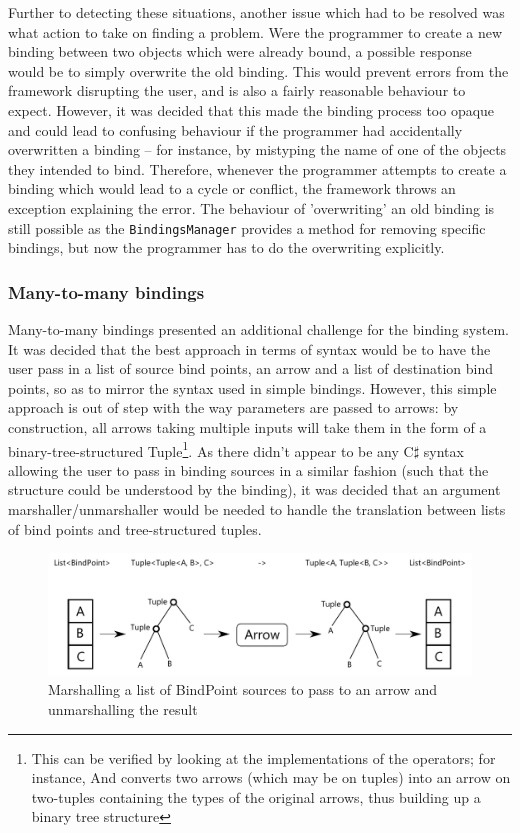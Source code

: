 \documentclass[12pt,twoside,notitlepage]{report}
\begin{document}
Further to detecting these situations, another issue which had to be resolved was what action to take on finding a problem. Were the programmer to create a new binding between two objects which were already bound, a possible response would be to simply overwrite the old binding. This would prevent errors from the framework disrupting the user, and is also a fairly reasonable behaviour to expect. However, it was decided that this made the binding process too opaque and could lead to confusing behaviour if the programmer had accidentally overwritten a binding -- for instance, by mistyping the name of one of the objects they intended to bind. Therefore, whenever the programmer attempts to create a binding which would lead to a cycle or conflict, the framework throws an exception explaining the error. The behaviour of 'overwriting' an old binding is still possible as the \texttt{BindingsManager} provides a method for removing specific bindings, but now the programmer has to do the overwriting explicitly.

\subsubsection{Many-to-many bindings}

Many-to-many bindings presented an additional challenge for the binding system. It was decided that the best approach in terms of syntax would be to have the user pass in a list of source bind points, an arrow and a list of destination bind points, so as to mirror the syntax used in simple bindings. However, this simple approach is out of step with the way parameters are passed to arrows: by construction, all arrows taking multiple inputs will take them in the form of a binary-tree-structured Tuple\footnote{This can be verified by looking at the implementations of the operators; for instance, And converts two arrows (which may be on tuples) into an arrow on two-tuples containing the types of the original arrows, thus building up a binary tree structure}. As there didn't appear to be any C$\sharp$ syntax allowing the user to pass in binding sources in a similar fashion (such that the structure could be understood by the binding), it was decided that an argument marshaller/unmarshaller would be needed to handle the translation between lists of bind points and tree-structured tuples.

\begin{figure}[!ht]
  \centering
  \includegraphics[width=\textwidth]{fig/ArgumentMarshalling.pdf}
  \caption{Marshalling a list of BindPoint sources to pass to an arrow and unmarshalling the result}
  \label{fig:argument_marshalling}
\end{figure}
\end{document}
